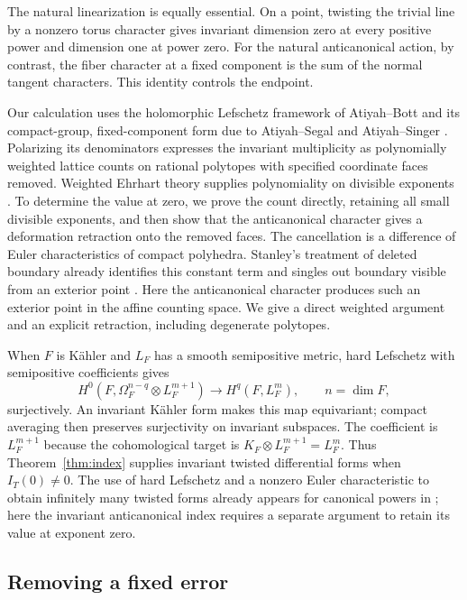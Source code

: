 The natural linearization is equally essential. On a point, twisting the
trivial line by a nonzero torus character gives invariant dimension zero
at every positive power and dimension one at power zero. For the natural
anticanonical action, by contrast, the fiber character at a fixed
component is the sum of the normal tangent characters. This identity
controls the endpoint.

Our calculation uses the holomorphic Lefschetz framework of
Atiyah--Bott \cite{AtiyahBott1966} and its compact-group, fixed-component
form due to Atiyah--Segal and Atiyah--Singer
\cite{AtiyahSegal1968,AtiyahSinger1968}. Polarizing its denominators
expresses the invariant multiplicity as polynomially weighted lattice
counts on rational polytopes with specified coordinate faces removed.
Weighted Ehrhart theory supplies polynomiality on divisible exponents
\cite[preprint \S2.4 and \S3.1]{BaldoniBerlineDeLoeraKoeppeVergne2012}.
To determine the value at zero, we prove the count directly, retaining
all small divisible exponents, and then show that the anticanonical
character gives a deformation retraction onto the removed faces.
The cancellation is a difference of Euler characteristics of compact
polyhedra. Stanley's treatment of deleted boundary already identifies
this constant term and singles out boundary visible from an exterior
point
\cite[Proposition~8.2 and the discussion and proof of Proposition~8.3]{Stanley1974Reciprocity}.
Here the anticanonical character produces such an exterior point in the
affine counting space. We give a direct weighted argument and an explicit
retraction, including degenerate polytopes.

When \(F\) is K\"ahler and \(L_F\) has a smooth semipositive metric,
hard Lefschetz with semipositive coefficients
\cite[Theorem~0.1]{DPS2001} gives
\[
H^0(F,\Omega_F^{n-q}\otimes L_F^{m+1})
\longrightarrow H^q(F,L_F^m),\qquad n=\dim F,
\]
surjectively. An invariant K\"ahler form makes this map equivariant;
compact averaging then preserves surjectivity on invariant subspaces.
The coefficient is \(L_F^{m+1}\) because the cohomological target is
\(K_F\otimes L_F^{m+1}=L_F^m\). Thus Theorem~\ref{thm:index} supplies
invariant twisted differential forms when \(I_T(0)\ne0\).
The use of hard Lefschetz and a nonzero Euler characteristic to obtain
infinitely many twisted forms already appears for canonical powers in
\cite[Theorem~2.7.3]{DPS2001}; here the invariant anticanonical index
requires a separate argument to retain its value at exponent zero.

\subsection{Removing a fixed error}

